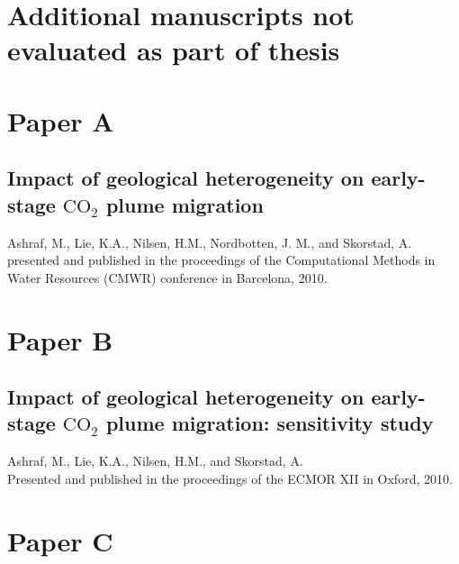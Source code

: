 \chapter{Additional manuscripts not evaluated as part of thesis}
\label{appendixA}

\pagebreak

\chapter*{Paper A}
\label{paperA}

\section{Impact of geological heterogeneity on early-stage $\mbox{CO}_2$ plume
migration}

\noindent Ashraf, M., Lie, K.A., Nilsen, H.M., Nordbotten, J. M., and
Skorstad, A.\\

\noindent presented and published in the proceedings of the Computational Methods in Water Resources
(CMWR) conference in Barcelona, 2010.
\cleardoublepage



\pagebreak

\chapter*{Paper B}
\label{paperB}

\section{Impact of geological heterogeneity on early-stage $\mbox{CO}_2$ plume
migration: sensitivity study}

\noindent Ashraf, M., Lie, K.A., Nilsen, H.M., and
Skorstad, A.\\

\noindent Presented and published in the proceedings of the ECMOR XII in Oxford, 2010.
\cleardoublepage



\pagebreak

\chapter*{Paper C}
\label{paperC}


